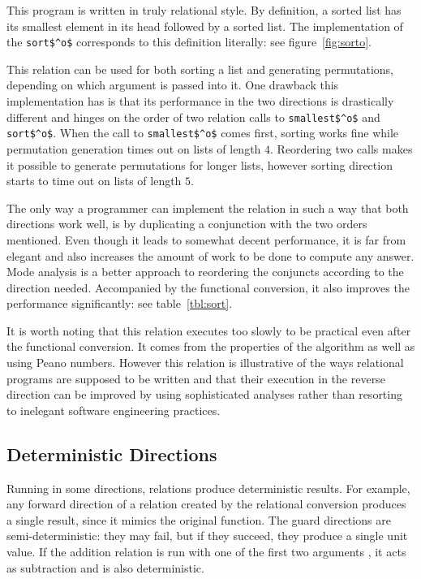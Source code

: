 

This program is written in truly relational style.
By definition, a sorted list has its smallest element in its head followed by a sorted list.
The implementation of the \lstinline{sort$^o$} corresponds to this definition literally: see figure~\ref{fig:sorto}.

This relation can be used for both sorting a list and generating permutations, depending on which argument is passed into it.
One drawback this implementation has is that its performance in the two directions is drastically different and hinges on the order of two relation calls to \lstinline{smallest$^o$} and \lstinline{sort$^o$}.
When the call to \lstinline{smallest$^o$} comes first, sorting works fine while permutation generation times out on lists of length $4$.
Reordering two calls makes it possible to generate permutations for longer lists, however sorting direction starts to time out on lists of length $5$.

The only way a programmer can implement the relation in such a way that both directions work well, is by duplicating a conjunction with the two orders mentioned.
Even though it leads to somewhat decent performance, it is far from elegant and also increases the amount of work to be done to compute any answer.
Mode analysis is a better approach to reordering the conjuncts according to the direction needed.
Accompanied by the functional conversion, it also improves the performance significantly: see table~\ref{tbl:sort}.

It is worth noting that this relation executes too slowly to be practical even after the functional conversion.
It comes from the properties of the algorithm as well as using Peano numbers.
However this relation is illustrative of the ways relational programs are supposed to be written and that their execution in the reverse direction can be improved by using sophisticated analyses rather than resorting to inelegant software engineering practices.


\subsection{Deterministic Directions}

Running in some directions, relations produce deterministic results.
For example, any forward direction of a relation created by the relational conversion produces a single result, since it mimics the original function.
The guard directions are semi-deterministic: they may fail, but if they succeed, they produce a single unit value.
If the addition relation is run with one of the first two arguments \outm, it acts as subtraction and is also deterministic.

